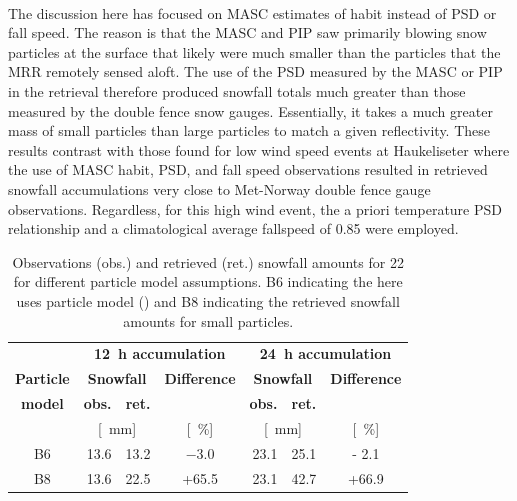 \\
The discussion here has focused on MASC estimates of habit instead of PSD or fall speed. The reason is that the MASC and PIP saw primarily blowing snow particles at the surface that likely were much smaller than the particles that the MRR remotely sensed aloft.  The use of the PSD measured by the MASC or PIP in the retrieval therefore produced snowfall totals much greater than those measured by the double fence snow gauges.  Essentially, it takes a much greater mass of small particles than large particles to match a given reflectivity. These results contrast with those found for low wind speed events at Haukeliseter where the use of MASC habit, PSD, and fall speed observations resulted in retrieved snowfall accumulations very close to Met-Norway double fence gauge observations.  Regardless, for this high wind event, the \citet{wood_estimation_2011} a priori temperature PSD relationship and a climatological average fallspeed of \SI{0.85}{\mPs} \citep[private communication,][]{Priv_Comm_Schirle} were employed.
\begin{table}[t]
	\begin{center}
		\caption{Observations (obs.) and retrieved (ret.) snowfall amounts for \SI{22}{\dec} for different particle model assumptions. B6 indicating the here uses particle model () and B8 indicating the retrieved snowfall amounts for small particles.}\label{tab:res:ret_sens}
		\begin{tabular}{c||r|r|c||r|r|c}
			\hline \hline
			& \multicolumn{3}{c||}{\textbf{\SI{12}{\hour} accumulation}} & \multicolumn{3}{c}{\textbf{\SI{24}{\hour} accumulation}}    \\\cline{2-7}
			\textbf{Particle} & \multicolumn{2}{c|}{\textbf{Snowfall}} & \textbf{Difference} &  \multicolumn{2}{c|}{\textbf{Snowfall}} & \textbf{Difference}   \\\cline{2-3} \cline{5-6}
			\textbf{model} & \textbf{obs.} & \textbf{ret.} && \textbf{obs.} & \textbf{ret.} &  \\\cline{2-7}
			& \multicolumn{2}{c|}{[\SI{}{\mm}]} & [\SI{}{\percent}]  & \multicolumn{2}{c|}{[\SI{}{\mm}]} & [\SI{}{\percent}]  \\ \hline\hline
			B6  & \num{13.6} &\num{13.2} & \num{-3.0} & \num{23.1} & \num{25.1} & \num{- 2.1}  \\\hline
			B8  & \num{13.6} &\num{22.5} & +\num{65.5} & \num{23.1} & \num{42.7} & +\num{66.9}  \\\hline\hline
		\end{tabular}
	\end{center}
\end{table}

